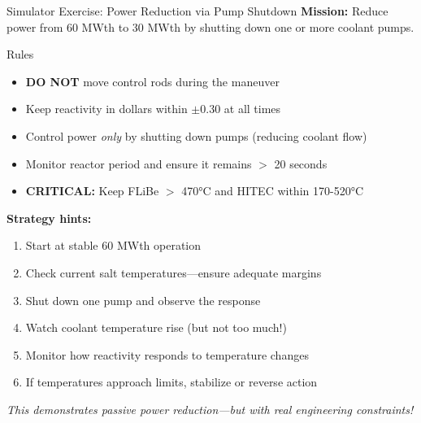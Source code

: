 \documentclass[aspectratio=169]{beamer}
\begin{document}
\begin{frame}[allowframebreaks]{Simulator Exercise: Power Reduction via Pump Shutdown}
    \textbf{Mission:} Reduce power from 60 MWth to 30 MWth by shutting down one or more coolant pumps.

    \vspace{1em}
    \begin{alertblock}{Rules}
        \begin{itemize}
            \item \textbf{DO NOT} move control rods during the maneuver
            \item Keep reactivity in dollars within $\pm$0.30 at all times
            \item Control power \textit{only} by shutting down pumps (reducing coolant flow)
            \item Monitor reactor period and ensure it remains $>$ 20 seconds
            \item \textbf{CRITICAL:} Keep FLiBe $>$ 470°C and HITEC within 170-520°C
        \end{itemize}
    \end{alertblock}

    \vspace{1em}
    \textbf{Strategy hints:}
    \begin{enumerate}
        \item Start at stable 60 MWth operation
        \item Check current salt temperatures—ensure adequate margins
        \item Shut down one pump and observe the response
        \item Watch coolant temperature rise (but not too much!)
        \item Monitor how reactivity responds to temperature changes
        \item If temperatures approach limits, stabilize or reverse action
    \end{enumerate}

    \vspace{1em}
    \textit{This demonstrates passive power reduction—but with real engineering constraints!}
\end{frame}
\end{document}
